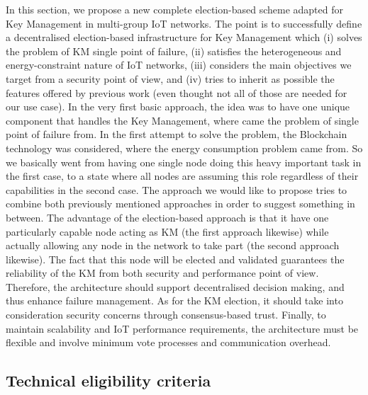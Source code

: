 In this section, we propose a new complete election-based scheme adapted for Key Management in multi-group IoT networks. The point is to successfully define a decentralised election-based infrastructure for Key Management which (i) solves the problem of KM single point of failure, (ii) satisfies the heterogeneous and energy-constraint nature of IoT networks, (iii) considers the main objectives we target from a security point of view, and (iv) tries to inherit as possible the features offered by previous work (even thought not all of those are needed for our use case).
In the very first basic approach, the idea was to have one unique component that handles the Key Management, where came the problem of single point of failure from. In the first attempt to solve the problem, the Blockchain technology was considered, where the energy consumption problem came from. So we basically went from having one single node doing this heavy important task in the first case, to a state where all nodes are assuming this role regardless of their capabilities in the second case. The approach we would like to propose tries to combine both previously mentioned approaches in order to suggest something in between. The advantage of the election-based approach is that it have one particularly capable node acting as KM (the first approach likewise) while actually allowing any node in the network to take part (the second approach likewise). The fact that this node will be elected and validated guarantees the reliability of the KM from both security and performance point of view. Therefore, the architecture should support decentralised decision making, and thus enhance failure management. As for the KM election, it should take into consideration security concerns through consensus-based trust. Finally, to maintain scalability and IoT performance requirements, the architecture must be flexible and involve minimum vote processes and communication overhead.

\subsection{Technical eligibility criteria}


